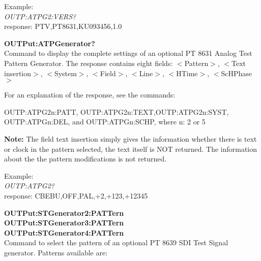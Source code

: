 Example:\\
\textit{OUTP:ATPG2:VERS?}\\
response: PTV,PT8631,KU093456,1.0

\textbf{OUTPut:ATPGenerator?}\\
Command to display the complete settings of an optional PT 8631 Analog Test Pattern Generator. The response contains eight fields: 
$<$Pattern$>$, $<$Text insertion$>$, $<$System$>$, $<$Field$>$, $<$Line$>$, $<$HTime$>$, $<$ScHPhase$>$

For an explanation of the response, see the commands: 

OUTP:ATPG2n:PATT, OUTP:ATPG2n:TEXT,OUTP:ATPG2n:SYST, OUTP:ATPGn:DEL, and OUTP:ATPGn:SCHP, where n: 2 or 5

\textbf{Note:} The field text insertion simply gives the information whether there is text or clock in the pattern selected, the text itself is NOT returned. The information about the the pattern modifications is not returned.

Example:\\
\textit{OUTP:ATPG2?}\\
response: CBEBU,OFF,PAL,+2,+123,+12345

\textbf{OUTPut:STGenerator2:PATTern}\\
\textbf{OUTPut:STGenerator3:PATTern}\\
\textbf{OUTPut:STGenerator4:PATTern}\\
Command to select the pattern of an optional PT 8639 SDI Test Signal generator. Patterns available are:

